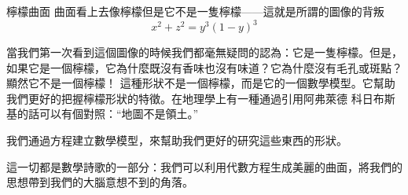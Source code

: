 \begin{surferPage}{檸檬曲面}
曲面看上去像檸檬但是它不是一隻檸檬——這就是所謂的圖像的背叛\\
\smallskip
\[x^2 + z^2 = y^3 (1 - y)^3\]

\singlespacing
當我們第一次看到這個圖像的時候我們都毫無疑問的認為：它是一隻檸檬。但是，如果它是一個檸檬，它為什麼既沒有香味也沒有味道？它為什麼沒有毛孔或斑點？顯然它不是一個檸檬！
\singlespacing
這種形狀不是一個檸檬，而是它的一個數學模型。它幫助我們更好的把握檸檬形狀的特徵。在地理學上有一種通過引用阿弗萊德 科日布斯基的話可以有個對照：\enquote{地圖不是領土。}\\

\singlespacing

我們通過方程建立數學模型，來幫助我們更好的研究這些東西的形狀。

\singlespacing

這一切都是數學詩歌的一部分：我們可以利用代數方程生成美麗的曲面，將我們的思想帶到我們的大腦意想不到的角落。
\end{surferPage}
